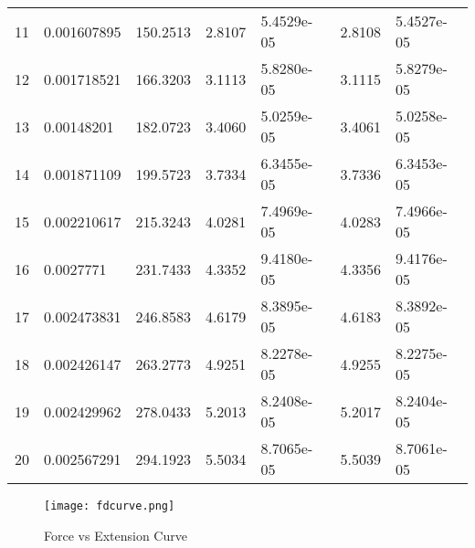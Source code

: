 \documentclass[12pt]{report}
\begin{document}
\begin{tabular}{|p{0.5cm}|p{2.1cm}|p{1.5cm}|p{2cm}|p{2cm}|p{2cm}|p{2cm}|}
    11      & 0.001607895            & 150.2513        & 2.8107                       & 5.4529e-05              & 2.8108                               & 5.4527e-05                        \\
    12      & 0.001718521            & 166.3203        & 3.1113                       & 5.8280e-05              & 3.1115                               & 5.8279e-05                        \\
    13      & 0.00148201             & 182.0723        & 3.4060                       & 5.0259e-05              & 3.4061                               & 5.0258e-05                        \\
    14      & 0.001871109            & 199.5723        & 3.7334                       & 6.3455e-05              & 3.7336                               & 6.3453e-05                        \\
    15      & 0.002210617            & 215.3243        & 4.0281                       & 7.4969e-05              & 4.0283                               & 7.4966e-05                        \\
    16      & 0.0027771              & 231.7433        & 4.3352                       & 9.4180e-05              & 4.3356                               & 9.4176e-05                        \\
    17      & 0.002473831            & 246.8583        & 4.6179                       & 8.3895e-05              & 4.6183                               & 8.3892e-05                        \\
    18      & 0.002426147            & 263.2773        & 4.9251                       & 8.2278e-05              & 4.9255                               & 8.2275e-05                        \\
    19      & 0.002429962            & 278.0433        & 5.2013                       & 8.2408e-05              & 5.2017                               & 8.2404e-05                        \\
    20      & 0.002567291            & 294.1923        & 5.5034                       & 8.7065e-05              & 5.5039                               & 8.7061e-05                        \\
    \hline
\end{tabular}

\begin{figure}[H]
    \centering
    \texttt{[image: fdcurve.png]}
    \caption{Force vs Extension Curve}
\end{figure}
\end{document}
